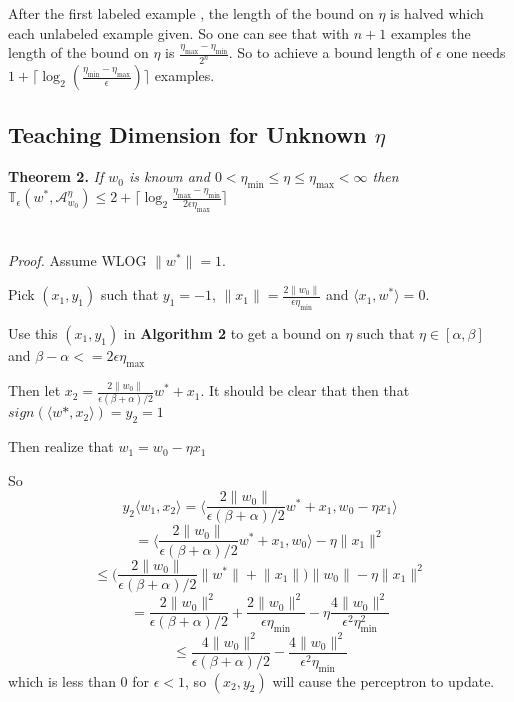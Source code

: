 \documentclass{article}
\newcommand{\learn}{\mathcal{A}_{w_0}^\eta}
\begin{document}
After the first labeled example , the length of the bound on $\eta$ is halved which each unlabeled example given. So one can see that with $n + 1$ examples the length of the bound on $\eta$ is $\frac{\eta_{\max} - \eta_{\min}}{2 ^ n }$. So to achieve a bound length of $\epsilon$ one needs
$ 1 + \lceil \log_2 ( \frac{\eta_
{\min} - \eta_{\max}}{\epsilon} ) \rceil$ examples.

\subsection{Teaching Dimension for Unknown $\eta$}

\textbf{Theorem 2.}
\textit{ If $w_0$ is known and $ 0 < \eta_{\min} \leq \eta \leq \eta_{\max} < \infty$ 
then $\mathbb{T}_{\epsilon}(w^*, \learn)  \leq 2 + \lceil \log_2 \frac{\eta_{\max} - \eta_{\min}}{2\epsilon\eta_{\max}}  \rceil$
}
\\
\\
\\
\textit{Proof.}
Assume WLOG $\lVert w^* \rVert = 1$.

Pick $(x_1,y_1)$ such that $y_1 = -1$, $\lVert x_1 \rVert = \frac{2 \lVert w_0 \rVert}{\epsilon \eta_{\min}}$ and $\langle x_1 , w^* \rangle = 0$.

Use this $(x_1, y_1)$ in \textbf{Algorithm 2} to get a bound on $\eta$ such that $\eta \in [\alpha , \beta]$ and $\beta - \alpha <= 2\epsilon \eta_{\max}$

Then let $x_2 = \frac{2 \lVert w_0 \rVert}{\epsilon (\beta + \alpha)/2}w^* + x_1$.
It should be clear that then that $sign(\langle w* , x_2 \rangle) =  y_2 = 1$

Then realize that
$w_1 = w_0 - \eta x_1$

So
$$
y_2 \langle w_1, x_2 \rangle  = \bigg\langle \frac{2 \lVert w_0 \rVert}{\epsilon (\beta + \alpha) /2} w^* + x_1 , w_0 - \eta x_1 \bigg\rangle
$$
$$
= \bigg\langle \frac{2 \lVert w_0 \rVert}{\epsilon (\beta + \alpha) /2} w^* + x_1 , w_0  \bigg\rangle - \eta \lVert x_1 \rVert^2
$$
$$
\leq \bigg( \frac{2 \lVert w_0 \rVert}{\epsilon (\beta + \alpha) /2} \lVert w^* \rVert + \lVert x_1 \rVert \bigg ) \lVert w_0 \rVert - \eta \lVert x_1 \rVert^2
$$
$$
= \frac{2 \lVert w_0 \rVert^2}{\epsilon (\beta + \alpha)/2} + \frac{2 \lVert w_0 \rVert ^2}{\epsilon \eta_{\min}} - \eta \frac{4 \lVert w_0 \rVert^2}{\epsilon^2 \eta_{\min}^2}
$$
$$
\leq \frac{4 \lVert w_0 \rVert^2}{\epsilon (\beta + \alpha)/2}  -  \frac{4 \lVert w_0 \rVert^2}{\epsilon^2 \eta_{\min}}
$$
which is less than $0$ for $\epsilon < 1$, so $(x_2 , y_2)$ will cause the perceptron to update.
\end{document}
